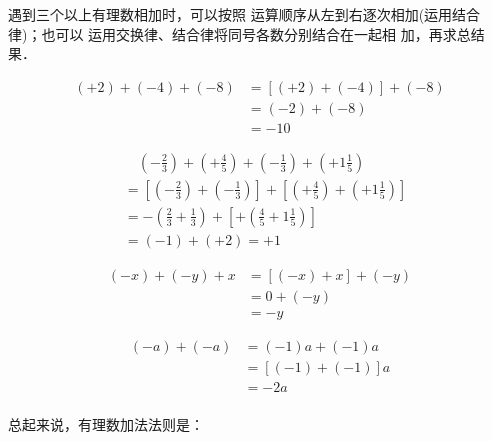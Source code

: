 \begin{analyze}
	遇到三个以上有理数相加时，可以按照
	运算顺序从左到右逐次相加(运用结合律)；也可以
	运用交换律、结合律将同号各数分别结合在一起相
	加，再求总结果．
\end{analyze}


\begin{solution}
	\begin{align*}
	(+2)+(-4)+(-8)&= [(+2)+(-4)]+(-8) \tag{结合律}\\
	&=(-2)+(-8) \tag{异号相加法则}\\
	&=-10 \tag{同号相加法则}
	\end{align*}
	
	\begin{align*}
	&\quad   \left(-\frac{2}{3}\right)+\left(+\frac{4}{5}\right)+\left(-\frac{1}{3}\right)+\left(+1\frac{1}{5}\right)\\
	&=\left[\left(-\frac{2}{3}\right)+\left(-\frac{1}{3}\right)\right]+\left[\left(+\frac{4}{5}\right)+\left(+1\frac{1}{5}\right)\right]  \tag{交换、结合律}\\
	&=-\left(\frac{2}{3}+\frac{1}{3}\right)+\left[+\left(\frac{4}{5}+1\frac{1}{5}\right)\right]  \tag{同号加法法则}\\
	&=(-1)+(+2)=+1  \tag{异号加法法则}
	\end{align*}
	
	\begin{align*}
	(-x)+(-y)+x  &= [(-x)+x]+(-y)  \tag{交换、结合律}\\
	&=0+(-y) \tag{相反数的性质}\\
	&=-y \tag{零的特性}
	\end{align*}
	
	\begin{align*}
	(-a)+(-a) &= (-1)a+(-1)a  \tag{相反数的意义}\\
	&=[(-1)+(-1)]a  \tag{分配律}\\
	&=-2a  \tag{同号加法法则}\\
	\end{align*}
\end{solution}

总起来说，有理数加法法则是：

